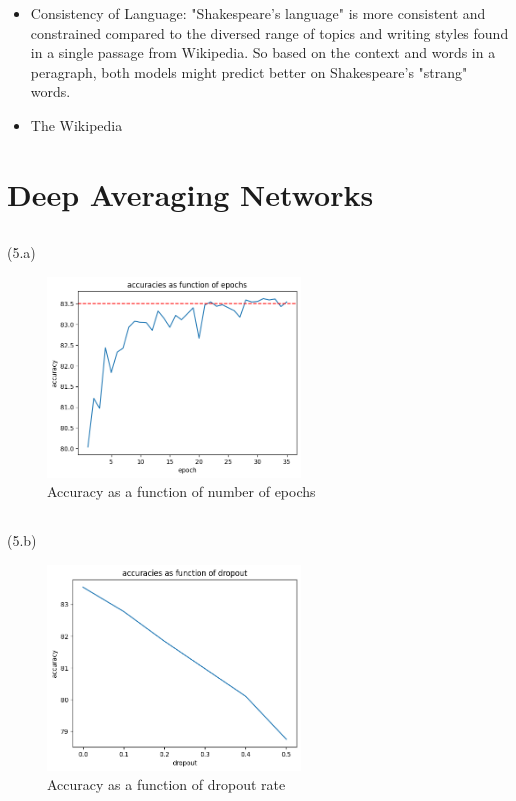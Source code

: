 \documentclass{article}
\begin{document}
\begin{itemize}
    \item Consistency of Language: "Shakespeare's language" is more consistent
    and constrained compared to the diversed range of topics and writing styles
    found in a single passage from Wikipedia. So based on the context and words in a peragraph,
    both models might predict better on Shakespeare's "strang" words.
    \item The Wikipedia
\end{itemize}

\section{Deep Averaging Networks}
\subsection{} %
\quad (5.a)
\begin{figure}[h]
\centering
\includegraphics[width=0.6\textwidth]{ims/5a.png}
\caption{Accuracy as a function of number of epochs}
\end{figure}
\subsection{} %
\quad (5.b)
\begin{figure}[h]
\centering
\includegraphics[width=0.6\textwidth]{ims/5b.png}
\caption{Accuracy as a function of dropout rate}
\end{figure}
\end{document}
